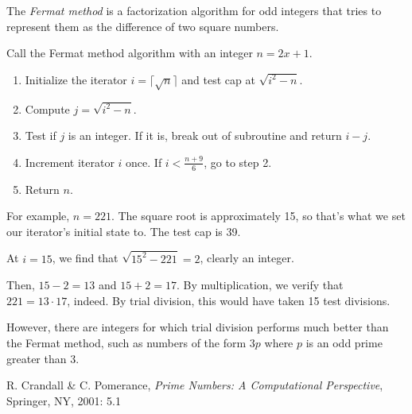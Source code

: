 \documentclass[12pt]{article}
\begin{document}
The {\em Fermat method} is a factorization algorithm for odd integers that tries to represent them as the difference of two square numbers.

Call the Fermat method algorithm with an integer $n = 2x + 1$.

\begin{enumerate}
\item Initialize the iterator $i = \lceil \sqrt{n} \rceil$ and test cap at $\sqrt{i^2 - n}$.
\item Compute $j = \sqrt{i^2 - n}$.
\item Test if $j$ is an integer. If it is, break out of subroutine and return $i - j$.
\item Increment iterator $i$ once. If $i < \frac{n + 9}{6}$, go to step 2.
\item Return $n$.
\end{enumerate}

For example, $n = 221$. The square root is approximately 15, so that's what we set our iterator's initial state to. The test cap is 39.

At $i = 15$, we find that $\sqrt{15^2 - 221} = 2$, clearly an integer.

Then, $15 - 2 = 13$ and $15 + 2 = 17$. By multiplication, we verify that $221 = 13 \cdot 17$, indeed. By trial division, this would have taken 15 test divisions.

However, there are integers for which trial division performs much better than the Fermat method, such as numbers of the form $3p$ where $p$ is an odd prime greater than 3.

\begin{thebibliography}{1}
 R. Crandall \& C. Pomerance, {\it Prime Numbers: A Computational Perspective}, Springer, NY, 2001: 5.1
\end{thebibliography}


\end{document}
